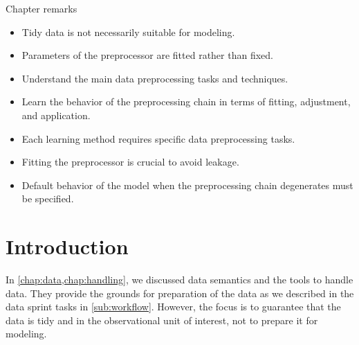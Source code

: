 \begin{mainbox}{Chapter remarks}


  \startcontents[chapters]
  \vspace{1em}


  \begin{itemize}
    \itemsep0em
    \item Tidy data is not necessarily suitable for modeling.
    \item Parameters of the preprocessor are fitted rather than fixed.
  \end{itemize}


  \begin{itemize}
    \itemsep0em
    \item Understand the main data preprocessing tasks and techniques.
    \item Learn the behavior of the preprocessing chain in terms of fitting, adjustment,
      and application.
  \end{itemize}


  \begin{itemize}
    \itemsep0em
    \item Each learning method requires specific data preprocessing tasks.
    \item Fitting the preprocessor is crucial to avoid leakage.
    \item Default behavior of the model when the preprocessing chain degenerates must be
      specified.
  \end{itemize}
\end{mainbox}

{}
\clearpage

\section{Introduction}

In \cref{chap:data,chap:handling}, we discussed data semantics and the tools to
handle data.  They provide the grounds for preparation of the data as we described in the
data sprint tasks in \cref{sub:workflow}.  However, the focus is to guarantee that the
data is tidy and in the observational unit of interest, not to prepare it for modeling.

